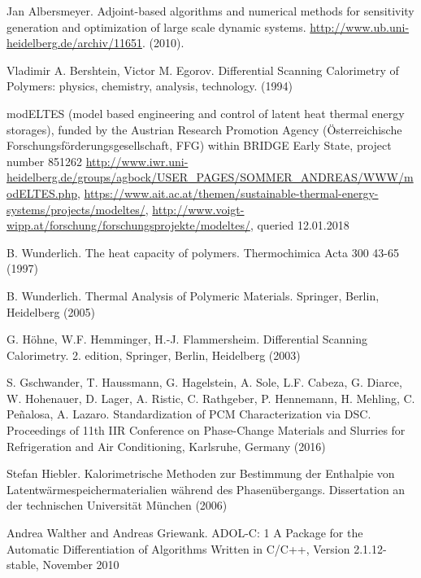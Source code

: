 \documentclass{scrartcl}[12pt, halfparskip]
\numberwithin{equation}{section}
\numberwithin{figure}{section}
\numberwithin{table}{section}
\begin{document}
\begin{thebibliography}{9}

	 Jan Albersmeyer.
	 Adjoint-based algorithms and numerical methods for sensitivity generation and optimization of large scale dynamic systems.
	 \url{http://www.ub.uni-heidelberg.de/archiv/11651}.
	 (2010).

	Vladimir A. Bershtein, Victor M. Egorov.
	Differential Scanning Calorimetry of Polymers: physics, chemistry, analysis, technology.
	(1994)
	
	modELTES (model based engineering and control of latent heat thermal energy storages), 
	funded by the Austrian Research Promotion Agency (Österreichische Forschungsförderungsgesellschaft, FFG) within BRIDGE Early State, project number 851262
	\url{http://www.iwr.uni-heidelberg.de/groups/agbock/USER_PAGES/SOMMER_ANDREAS/WWW/modELTES.php}, 
	\url{https://www.ait.ac.at/themen/sustainable-thermal-energy-systems/projects/modeltes/}, 
	\url{http://www.voigt-wipp.at/forschung/forschungsprojekte/modeltes/}, queried 12.01.2018
	
	B. Wunderlich.
	The heat capacity of polymers.
	Thermochimica Acta 300 43-65 (1997)
	
	B. Wunderlich.
	Thermal Analysis of Polymeric Materials.
	Springer, Berlin, Heidelberg (2005)
	
	G. Höhne, W.F. Hemminger, H.-J. Flammersheim.
	Differential Scanning Calorimetry.
	2. edition, Springer, Berlin, Heidelberg (2003)
	
	S. Gschwander, T. Haussmann, G. Hagelstein, A. Sole, L.F. Cabeza, G. Diarce, W. Hohenauer, D. Lager, A. Ristic, C. Rathgeber, P. Hennemann, H. Mehling, C. Peñalosa, A. Lazaro.
	Standardization of PCM Characterization via DSC.
	Proceedings of 11th IIR Conference on Phase-Change Materials and Slurries for Refrigeration and Air Conditioning, Karlsruhe, Germany (2016)
	
	Stefan Hiebler.
	Kalorimetrische Methoden zur Bestimmung
	der Enthalpie von Latentwärmespeichermaterialien
	während des Phasenübergangs.
	Dissertation an der technischen Universität München 
	(2006)

	Andrea Walther and Andreas Griewank.
	ADOL-C: 1
	A Package for the Automatic Differentiation
	of Algorithms Written in C/C++,
	Version 2.1.12-stable, November 2010


\end{thebibliography}
\end{document}
